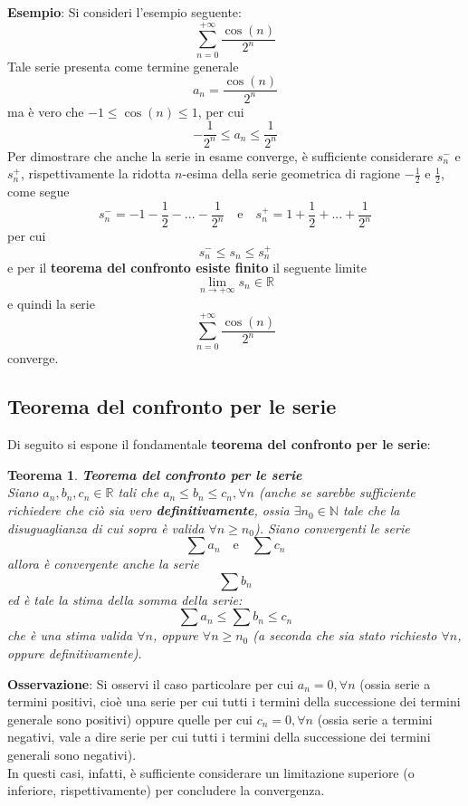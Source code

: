 \documentclass[a4paper]{extarticle}
\newtheorem{theorem}{Teorema}[section]
\begin{document}
\vspace{1em}
\noindent
\textbf{Esempio}: Si consideri l'esempio seguente:
\[\sum_{n=0}^{+\infty} \frac{\cos(n)}{2^n}\]
Tale serie presenta come termine generale
\[a_n = \frac{\cos(n)}{2^n}\]
ma è vero che $-1 \leq \cos(n) \leq 1$, per cui
\[-\frac{1}{2^n} \leq a_n \leq \frac{1}{2^n}\]
Per dimostrare che anche la serie in esame converge, è sufficiente considerare $s_n^-$ e $s_n^+$, rispettivamente la ridotta $n$-esima della serie geometrica di ragione $-\frac{1}{2}$ e $\frac{1}{2}$, come segue
\[s_n^- = -1 - \frac{1}{2} - ... - \frac{1}{2^n} \hspace{1em} \text{e} \hspace{1em} s_n^+ = 1 + \frac{1}{2} + ... + \frac{1}{2^n}\]
per cui
\[s_n^- \leq s_n \leq s_n^+\]
e per il \textbf{teorema del confronto esiste finito} il seguente limite
\[\lim_{n \to +\infty} s_n \in \mathbb{R}\]
e quindi la serie
\[\sum_{n=0}^{+\infty} \frac{\cos(n)}{2^n}\]
converge.

\vspace{1em}
\noindent
\subsection{Teorema del confronto per le serie}
Di seguito si espone il fondamentale \textbf{teorema del confronto per le serie}:

\vspace{1em}
\noindent
\begin{theorem} \textbf{Teorema del confronto per le serie}\\
    Siano $a_n,b_n,c_n \in \mathbb{R}$ tali che $a_n \leq b_n \leq c_n, \forall n$ (anche se sarebbe sufficiente richiedere che ciò sia vero \textbf{definitivamente}, ossia $\exists n_0 \in \mathbb{N}$ tale che la disuguaglianza di cui sopra è valida $\forall n \geq n_0$). Siano convergenti le serie
    \[\sum a_n \hspace{1em} \text{e} \hspace{1em} \sum c_n\]
    allora è convergente anche la serie
    \[\sum b_n\]
    ed è tale la stima della somma della serie:
    \[\sum a_n \leq \sum b_n \leq c_n\]
    che è una stima valida $\forall n$, oppure $\forall n \geq n_0$ (a seconda che sia stato richiesto $\forall n$, oppure definitivamente).
\end{theorem}

\vspace{1em}
\noindent
\textbf{Osservazione}: Si osservi il caso particolare per cui $a_n=0, \forall n$ (ossia serie a termini positivi, cioè una serie per cui tutti i termini della successione dei termini generale sono positivi) oppure quelle per cui $c_n=0, \forall n$ (ossia serie a termini negativi, vale a dire serie per cui tutti i termini della successione dei termini generali sono negativi).\\
In questi casi, infatti, è sufficiente considerare un limitazione superiore (o inferiore, rispettivamente) per concludere la convergenza.\\
\end{document}
